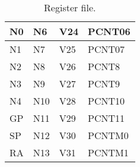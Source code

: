 \begin{table}[hbt!]
\begin{center}
\begin{tabular}{|l|l|l|l|}
        N0 & N6 & V24 & PCNT06 \\
        \hline
        N1 & N7 & V25 & PCNT07 \\
        \hline
        N2 & N8 & V26 & PCNT8 \\
        \hline
        N3 & N9 & V27 & PCNT9 \\
        \hline
        N4 & N10 & V28 & PCNT10 \\
        \hline
        GP & N11 & V29 & PCNT11 \\
        \hline
        SP & N12 & V30 & PCNTM0 \\
        \hline
        RA & N13 & V31 & PCNTM1 \\
        \hline

    \end{tabular}

    \caption[Register file]{Register file.}

    \end{center}
    
\end{table}